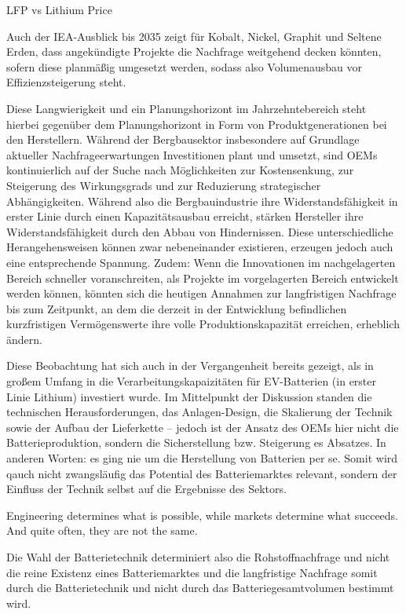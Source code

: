 \documentclass[12pt,a4paper,oneside]{book} %
\begin{document}
	LFP vs Lithium Price
	
	Auch der IEA-Ausblick bis 2035 zeigt für Kobalt, Nickel, Graphit und Seltene Erden, dass angekündigte Projekte die Nachfrage weitgehend decken könnten, sofern diese planmäßig umgesetzt werden, sodass also Volumenausbau vor Effizienzsteigerung steht.
	
	Diese Langwierigkeit und ein Planungshorizont im Jahrzehntebereich steht hierbei gegenüber dem Planungshorizont in Form von Produktgenerationen bei den Herstellern. Während der Bergbausektor insbesondere auf Grundlage aktueller Nachfrageerwartungen Investitionen plant und umsetzt, sind OEMs kontinuierlich auf der Suche nach Möglichkeiten zur Kostensenkung, zur Steigerung des Wirkungsgrads und zur Reduzierung strategischer Abhängigkeiten. Während also die Bergbauindustrie ihre Widerstandsfähigkeit in erster Linie durch einen Kapazitätsausbau erreicht, stärken Hersteller ihre Widerstandsfähigkeit durch den Abbau von Hindernissen. Diese unterschiedliche Herangehensweisen können zwar nebeneinander existieren, erzeugen jedoch auch eine entsprechende Spannung. Zudem: Wenn die Innovationen im nachgelagerten Bereich schneller voranschreiten, als Projekte im vorgelagerten Bereich entwickelt werden können, könnten sich die heutigen Annahmen zur langfristigen Nachfrage bis zum Zeitpunkt, an dem die derzeit in der Entwicklung befindlichen kurzfristigen Vermögenswerte ihre volle Produktionskapazität erreichen, erheblich ändern.
	
	Diese Beobachtung hat sich auch in der Vergangenheit bereits gezeigt, als in großem Umfang in die Verarbeitungskapaizitäten für EV-Batterien (in erster Linie Lithium) investiert wurde. Im Mittelpunkt der Diskussion standen die technischen Herausforderungen, das Anlagen-Design, die Skalierung der Technik sowie der Aufbau der Lieferkette -- jedoch ist der Ansatz des OEMs hier nicht die Batterieproduktion, sondern die Sicherstellung bzw. Steigerung es Absatzes. In anderen Worten: es ging nie um die Herstellung von Batterien per se. Somit wird qauch nicht zwangsläufig das Potential des Batteriemarktes relevant, sondern der Einfluss der Technik selbst auf die Ergebnisse des Sektors.
	
	Engineering determines what is possible, while markets determine what succeeds. And quite often, they are not the same.
	
	Die Wahl der Batterietechnik determiniert also die Rohstoffnachfrage und nicht die reine Existenz eines Batteriemarktes\autocite{Nature Communications (Cheng et al. 2024} und die langfristige Nachfrage somit durch die Batterietechnik und nicht durch das Batteriegesamtvolumen bestimmt wird.
	
\end{document}
